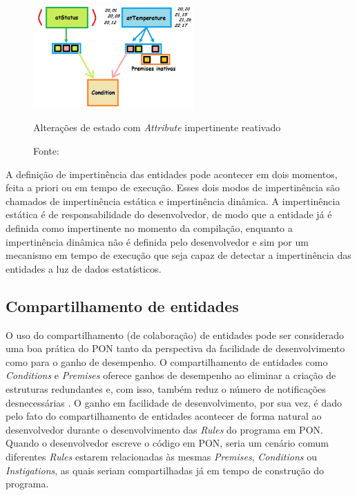 \begin{figure}[!htb]
  \centering
  \includegraphics[width=0.55\textwidth]{../figures/pr_imp_3.png}
  \smallskip
  \caption{Alterações de estado com \textit{Attribute} impertinente reativado}
    \caption*{Fonte: }
  \label{fig:pr_imp_3}
\end{figure}

\FloatBarrier

A definição de impertinência das entidades pode acontecer em dois momentos,
feita a priori ou em tempo de execução. Esses dois modos de impertinência são
chamados de impertinência estática e impertinência dinâmica. A impertinência
estática é de responsabilidade do desenvolvedor, de modo que a entidade já é
definida como impertinente no momento da compilação, enquanto a impertinência
dinâmica não é definida pelo desenvolvedor e sim por um mecanismo em tempo de
execução que seja capaz de detectar a impertinência das entidades a luz de dados
estatísticos.

\subsection{Compartilhamento de entidades}\label{sec:compartilhamento}

O uso do compartilhamento (de colaboração) de entidades pode ser considerado uma
boa prática do PON tanto da perspectiva da facilidade de desenvolvimento como
para o ganho de desempenho. O compartilhamento de entidades como
\textit{Conditions} e \textit{Premises} oferece ganhos de desempenho ao eliminar
a criação de estruturas redundantes e, com isso, também reduz o número de
notificações desnecessárias \cite{msc_Ronszcka_2012}. O ganho em facilidade de
desenvolvimento, por sua vez, é dado pelo fato do compartilhamento de entidades
acontecer de forma natural ao desenvolvedor durante o desenvolvimento das
\textit{Rules} do programa em PON. Quando o desenvolvedor escreve o código em
PON, seria um cenário comum diferentes \textit{Rules} estarem relacionadas às
mesmas \textit{Premises}, \textit{Conditions} ou \textit{Instigations}, as quais
seriam compartilhadas já em tempo de construção do programa.

